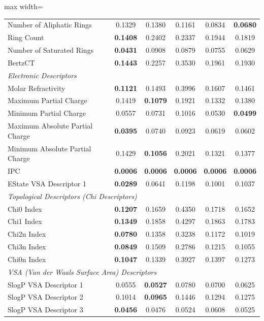 \begin{table}[h!]
\begin{adjustbox}{max width=\textwidth}
\begin{tabular}{|l|c|c|c|c|c|}
    Number of Aliphatic Rings & 0.1329 & 0.1380 & 0.1161 & 0.0834 & \textbf{0.0680} \\
    Ring Count & \textbf{0.1408} & 0.2402 & 0.2337 & 0.1944 & 0.1819 \\
    Number of Saturated Rings & \textbf{0.0431} & 0.0908 & 0.0879 & 0.0755 & 0.0629 \\
    BertzCT & \textbf{0.1443} & 0.2257 & 0.3530 & 0.1961 & 0.1930 \\
    \hline
    \multicolumn{6}{|l|}{\textit{Electronic Descriptors}} \\
    \hline
    Molar Refractivity & \textbf{0.1121} & 0.1493 & 0.3996 & 0.1607 & 0.1461 \\
    Maximum Partial Charge & 0.1419 & \textbf{0.1079} & 0.1921 & 0.1332 & 0.1380 \\
    Minimum Partial Charge & 0.0557 & 0.0731 & 0.1016 & 0.0530 & \textbf{0.0499} \\
    Maximum Absolute Partial Charge & \textbf{0.0395} & 0.0740 & 0.0923 & 0.0619 & 0.0602 \\
    Minimum Absolute Partial Charge & 0.1429 & \textbf{0.1056} & 0.2021 & 0.1321 & 0.1377 \\
    IPC & \textbf{0.0006} & \textbf{0.0006} & \textbf{0.0006} & \textbf{0.0006} & \textbf{0.0006} \\
    EState VSA Descriptor 1 & \textbf{0.0289} & 0.0641 & 0.1198 & 0.1001 & 0.1037 \\
    \hline
    \multicolumn{6}{|l|}{\textit{Topological Descriptors (Chi Descriptors)}} \\
    \hline
    Chi0 Index & \textbf{0.1207} & 0.1659 & 0.4350 & 0.1718 & 0.1652 \\
    Chi1 Index & \textbf{0.1349} & 0.1858 & 0.4297 & 0.1863 & 0.1783 \\
    Chi2n Index & \textbf{0.0780} & 0.1358 & 0.3238 & 0.1172 & 0.1019 \\
    Chi3n Index & \textbf{0.0849} & 0.1509 & 0.2786 & 0.1215 & 0.1055 \\
    Chi0n Index & \textbf{0.1047} & 0.1339 & 0.3927 & 0.1397 & 0.1273 \\
    \hline
    \multicolumn{6}{|l|}{\textit{VSA (Van der Waals Surface Area) Descriptors}} \\
    \hline
    SlogP VSA Descriptor 1 & 0.0555 & \textbf{0.0527} & 0.0780 & 0.0700 & 0.0625 \\
    SlogP VSA Descriptor 2 & 0.1014 & \textbf{0.0965} & 0.1446 & 0.1294 & 0.1275 \\
    SlogP VSA Descriptor 3 & \textbf{0.0456} & 0.0476 & 0.0524 & 0.0608 & 0.0525 \\

\end{tabular}
\end{adjustbox}
\end{table}
